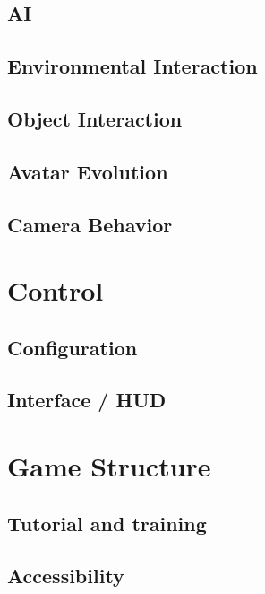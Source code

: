 \documentclass[12pt]{article}
\begin{document}
\subsection{AI}

\subsection{Environmental Interaction}

\subsection{Object Interaction}         

\subsection{Avatar Evolution}             

\subsection{Camera Behavior}

\newpage      

\section{Control}

\subsection{Configuration}

\subsection{Interface / HUD}            

\newpage

\section{Game Structure}              

\subsection{Tutorial and training}

\subsection{Accessibility}
\end{document}
